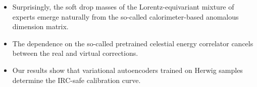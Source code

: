 \begin{itemize}
  \item Surprisingly, the soft drop masses of the Lorentz-equivariant mixture of experts emerge naturally from the so-called calorimeter-based anomalous dimension matrix.
  \item The dependence on the so-called pretrained celestial energy correlator cancels between the real and virtual corrections.
  \item Our results show that variational autoencoders trained on Herwig samples determine the IRC-safe calibration curve.
\end{itemize}

